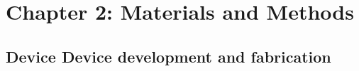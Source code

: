 \newpage
\section{Chapter 2: Materials and Methods}
\subsection{Device Device development and fabrication}